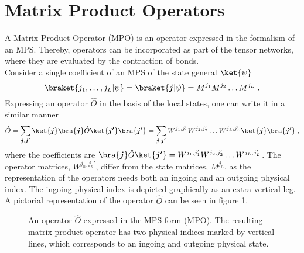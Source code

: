 \section{Matrix Product Operators} \label{sec:MPO}
A Matrix Product Operator (MPO) is an operator expressed in the formalism of an MPS. Thereby, operators can be incorporated as part of the tensor networks, where they are evaluated by the contraction of bonds.\\
Consider a single coefficient of an MPS of the state general $\ket{\psi}$
\begin{equation}
	\braket{j_1 , \ldots , j_L | \psi} = \braket{\boldsymbol{j} | \psi} = M^{j_1} M^{j_2} \ldots M^{j_L} \; . 
\end{equation}
Expressing an operator $\hat{O}$ in the basis of the local states, one can write it in a similar manner
\begin{equation}
	\hat{O} = \sum_{\boldsymbol{j} , \boldsymbol{j'}} \ket{\boldsymbol{j}} \bra{\boldsymbol{j}} \hat{O} \ket{\boldsymbol{j'}} \bra{\boldsymbol{j'}} = \sum_{\boldsymbol{j} , \boldsymbol{j'}} W^{j_1 , j_1 '} W^{j_2 , j_2 '} \ldots W^{j_L , j_L '} \ket{\boldsymbol{j}} \bra{\boldsymbol{j '}} \; ,
	\label{eq:MPOrep}
\end{equation}
where the coefficients are $\bra{\boldsymbol{j}} \hat{O} \ket{\boldsymbol{j'}} = W^{j_1 , j_1 '} W^{j_2 , j_2 '} \ldots W^{j_L , j_L '}$. The operator matrices, $W^{j_n , j_n '}$, differ from the state matrices, $M^{j_n}$, as the representation of the operators needs both an ingoing and an outgoing physical index. The ingoing physical index is depicted graphically as an extra vertical leg. A pictorial representation of the operator $\hat{O}$ can be seen in figure \ref{fig:MPOchain}.
\begin{figure}[h!]
	\centering
	
	\caption{An operator $\hat{O}$ expressed in the MPS form (MPO). The resulting matrix product operator has two physical indices marked by vertical lines, which corresponds to an ingoing and outgoing physical state.}
	\label{fig:MPOchain}
\end{figure}

